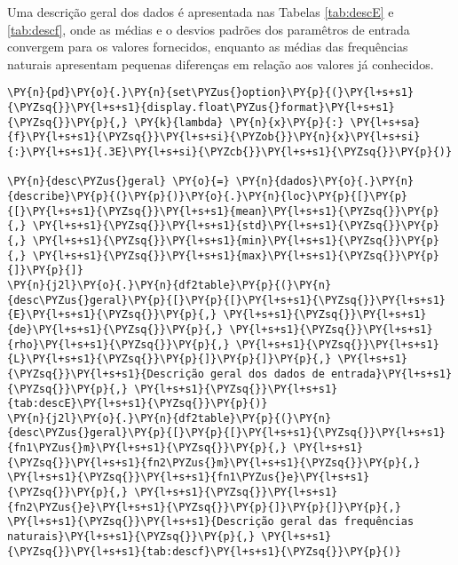     Uma descrição geral dos dados é apresentada nas Tabelas \ref{tab:descE}
e \ref{tab:descf}, onde as médias e o desvios padrões dos paramêtros de
entrada convergem para os valores fornecidos, enquanto as médias das
frequências naturais apresentam pequenas diferenças em relação aos
valores já conhecidos.

    \begin{tcolorbox}[breakable, size=fbox, boxrule=1pt, pad at break*=1mm,colback=cellbackground, colframe=cellborder]
\begin{Verbatim}[commandchars=\\\{\}]
\PY{n}{pd}\PY{o}{.}\PY{n}{set\PYZus{}option}\PY{p}{(}\PY{l+s+s1}{\PYZsq{}}\PY{l+s+s1}{display.float\PYZus{}format}\PY{l+s+s1}{\PYZsq{}}\PY{p}{,} \PY{k}{lambda} \PY{n}{x}\PY{p}{:} \PY{l+s+sa}{f}\PY{l+s+s1}{\PYZsq{}}\PY{l+s+si}{\PYZob{}}\PY{n}{x}\PY{l+s+si}{:}\PY{l+s+s1}{.3E}\PY{l+s+si}{\PYZcb{}}\PY{l+s+s1}{\PYZsq{}}\PY{p}{)}

\PY{n}{desc\PYZus{}geral} \PY{o}{=} \PY{n}{dados}\PY{o}{.}\PY{n}{describe}\PY{p}{(}\PY{p}{)}\PY{o}{.}\PY{n}{loc}\PY{p}{[}\PY{p}{[}\PY{l+s+s1}{\PYZsq{}}\PY{l+s+s1}{mean}\PY{l+s+s1}{\PYZsq{}}\PY{p}{,} \PY{l+s+s1}{\PYZsq{}}\PY{l+s+s1}{std}\PY{l+s+s1}{\PYZsq{}}\PY{p}{,} \PY{l+s+s1}{\PYZsq{}}\PY{l+s+s1}{min}\PY{l+s+s1}{\PYZsq{}}\PY{p}{,} \PY{l+s+s1}{\PYZsq{}}\PY{l+s+s1}{max}\PY{l+s+s1}{\PYZsq{}}\PY{p}{]}\PY{p}{]}
\PY{n}{j2l}\PY{o}{.}\PY{n}{df2table}\PY{p}{(}\PY{n}{desc\PYZus{}geral}\PY{p}{[}\PY{p}{[}\PY{l+s+s1}{\PYZsq{}}\PY{l+s+s1}{E}\PY{l+s+s1}{\PYZsq{}}\PY{p}{,} \PY{l+s+s1}{\PYZsq{}}\PY{l+s+s1}{de}\PY{l+s+s1}{\PYZsq{}}\PY{p}{,} \PY{l+s+s1}{\PYZsq{}}\PY{l+s+s1}{rho}\PY{l+s+s1}{\PYZsq{}}\PY{p}{,} \PY{l+s+s1}{\PYZsq{}}\PY{l+s+s1}{L}\PY{l+s+s1}{\PYZsq{}}\PY{p}{]}\PY{p}{]}\PY{p}{,} \PY{l+s+s1}{\PYZsq{}}\PY{l+s+s1}{Descrição geral dos dados de entrada}\PY{l+s+s1}{\PYZsq{}}\PY{p}{,} \PY{l+s+s1}{\PYZsq{}}\PY{l+s+s1}{tab:descE}\PY{l+s+s1}{\PYZsq{}}\PY{p}{)}
\PY{n}{j2l}\PY{o}{.}\PY{n}{df2table}\PY{p}{(}\PY{n}{desc\PYZus{}geral}\PY{p}{[}\PY{p}{[}\PY{l+s+s1}{\PYZsq{}}\PY{l+s+s1}{fn1\PYZus{}m}\PY{l+s+s1}{\PYZsq{}}\PY{p}{,} \PY{l+s+s1}{\PYZsq{}}\PY{l+s+s1}{fn2\PYZus{}m}\PY{l+s+s1}{\PYZsq{}}\PY{p}{,} \PY{l+s+s1}{\PYZsq{}}\PY{l+s+s1}{fn1\PYZus{}e}\PY{l+s+s1}{\PYZsq{}}\PY{p}{,} \PY{l+s+s1}{\PYZsq{}}\PY{l+s+s1}{fn2\PYZus{}e}\PY{l+s+s1}{\PYZsq{}}\PY{p}{]}\PY{p}{]}\PY{p}{,} \PY{l+s+s1}{\PYZsq{}}\PY{l+s+s1}{Descrição geral das frequências naturais}\PY{l+s+s1}{\PYZsq{}}\PY{p}{,} \PY{l+s+s1}{\PYZsq{}}\PY{l+s+s1}{tab:descf}\PY{l+s+s1}{\PYZsq{}}\PY{p}{)}
\end{Verbatim}
\end{tcolorbox}

